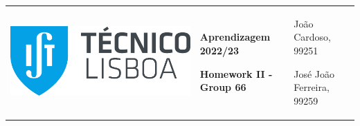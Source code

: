 \documentclass[11pt,a4paper]{article}
\begin{document}
\pagebreak
\color{darkgray}
\hspace{-8.25mm}
\begin{tabularx}{1.09\textwidth} {>{\raggedright\arraybackslash}X >{\centering\arraybackslash}X >{\raggedleft\arraybackslash}X}
  \includegraphics[scale=0.2]{tecnico.pdf}                           &
  \textbf{Aprendizagem 2022/23} \par \textbf{Homework II - Group 66} &
  João Cardoso, 99251 \par José João Ferreira, 99259
\end{tabularx}
\color{black}

\begin{center}
  \textbf{ }
\end{center}
\end{document}
